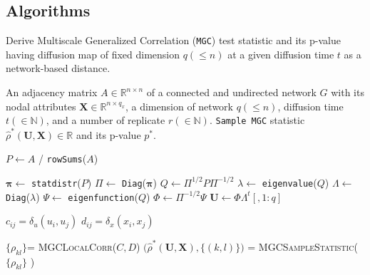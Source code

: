 \documentclass[11pt]{article}
\theoremstyle{definition}
\begin{document}
	\subsection{Algorithms}
	\begin{algorithm}
		\caption{ Derive Multiscale Generalized Correlation (\texttt{MGC}) test statistic and its p-value having diffusion map of fixed dimension $q ( \leq n )$ at a given diffusion time $t$ as a network-based distance.}
		\begin{algorithmic}[1]
			\Require An adjacency matrix $A \in \mathbb{R}^{ n \times n }$ of a connected and undirected network $G$ with its nodal attributes $\mathbf{X} \in \mathbb{R}^{n \times q_{x}}$, a dimension of network $q ( \leq n)$, diffusion time $t (\in \mathbb{N})$, and a number of replicate $r (\in \mathbb{N})$.
			\Ensure  \texttt{Sample MGC} statistic $\hat{\rho}^{*}(\mathbf{U}, \mathbf{X}) \in \mathbb{R}$ and its p-value $p^{*}$. 
			
			\State $P \leftarrow A $ / \texttt{rowSums}($A$) 
			
			\State $\mathbf{\pi} \leftarrow$ \texttt{statdistr}($P$) 
			\State $\Pi  \leftarrow$ \texttt{Diag}($\mathbf{\pi}$)
			\State $Q \leftarrow \Pi^{1/2} P \Pi^{-1/2}$ 
			\State $\lambda \leftarrow $ \texttt{eigenvalue}($Q$)
			\State $\Lambda \leftarrow $ \texttt{Diag}($\lambda$)
			\State $\Psi \leftarrow$ \texttt{eigenfunction}($Q$)
			\State $\Phi \leftarrow  \Pi^{-1/2} \Psi$ 
			\State $\mathbf{U} \leftarrow \Phi \Lambda^{t}[,1:q]$   
			
			\State  $c_{ij} = \delta_u(u_i,u_j)$ 
			\State  $d_{ij} = \delta_x(x_i,x_j)$
			\EndFor
			
			
			
			\State  $\{ \rho_{kl} \}$= \textsc{MGCLocalCorr}($C, D$) 
			\State $\big( \hat{\rho}^{*}(\mathbf{U}, \mathbf{X}), \{  (k,l) \}  \big)$ =  \textsc{MGCSampleStatistic}( $\{  \rho_{kl}  \}$  ) \\ 
			

\end{algorithmic}
\end{algorithm}
\end{document}
